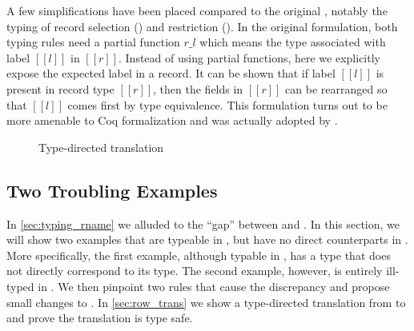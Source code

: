 \begin{remark}
  A few simplifications have been placed compared to the original \rname,
  notably the typing of record selection () and restriction
  (). In the original formulation, both typing rules need a
  partial function $ r \_ l $ which means the type associated with label $[[l]]$
  in $[[r]]$. Instead of using partial functions, here we explicitly expose the
  expected label in a record. It can be shown that if label $[[l]]$ is present
  in record type $[[r]]$, then the fields in $[[r]]$ can be rearranged so that
  $[[l]]$ comes first by type equivalence. This formulation turns out to be more
  amenable to Coq formalization and was actually adopted by
  \cite{leijen2005extensible}.
\end{remark}


\begin{figure}[t]
  \centering
{}
\caption{Type-directed translation}
\label{fig:typing_rname}
\end{figure}



\renewcommand{\rulehl}[1]{#1}

\subsection{Two Troubling Examples}
\label{sec:trouble}

In \cref{sec:typing_rname} we alluded to the ``gap'' between \rname and \fnamee.
In this section, we will show two examples that are typeable in \rname, but have
no direct counterparts in \fnamee. More specifically, the first example,
although typable in \fnamee, has a type that does not directly correspond to its
\rname type. The second example, however, is entirely ill-typed in \fnamee. We
then pinpoint two rules that cause the discrepancy and propose small changes to
\rname. In \cref{sec:row_trans} we show a type-directed translation from \rname
to \fnamee and prove the translation is type safe.

